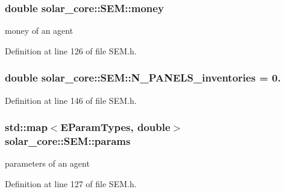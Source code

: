 \hypertarget{classsolar__core_1_1_s_e_m_ac2c452b6783b521c59d3b82dba6d08cb}{}
\subsubsection[{money}]{\setlength{\rightskip}{0pt plus 5cm}double solar\+\_\+core\+::\+S\+E\+M\+::money\hspace{0.3cm}{\ttfamily [protected]}}\label{classsolar__core_1_1_s_e_m_ac2c452b6783b521c59d3b82dba6d08cb}
money of an agent 

Definition at line 126 of file S\+E\+M.\+h.

\hypertarget{classsolar__core_1_1_s_e_m_a6822b2c6d30e2aaaf5dbe0b50ce221a1}{}
\subsubsection[{N\+\_\+\+P\+A\+N\+E\+L\+S\+\_\+inventories}]{\setlength{\rightskip}{0pt plus 5cm}double solar\+\_\+core\+::\+S\+E\+M\+::\+N\+\_\+\+P\+A\+N\+E\+L\+S\+\_\+inventories = 0.\hspace{0.3cm}{\ttfamily [protected]}}\label{classsolar__core_1_1_s_e_m_a6822b2c6d30e2aaaf5dbe0b50ce221a1}


Definition at line 146 of file S\+E\+M.\+h.

\hypertarget{classsolar__core_1_1_s_e_m_a52adde99943cf97f4a024927ca57c087}{}
\subsubsection[{params}]{\setlength{\rightskip}{0pt plus 5cm}std\+::map$<${\bf E\+Param\+Types}, double$>$ solar\+\_\+core\+::\+S\+E\+M\+::params\hspace{0.3cm}{\ttfamily [protected]}}\label{classsolar__core_1_1_s_e_m_a52adde99943cf97f4a024927ca57c087}
parameters of an agent 

Definition at line 127 of file S\+E\+M.\+h.

